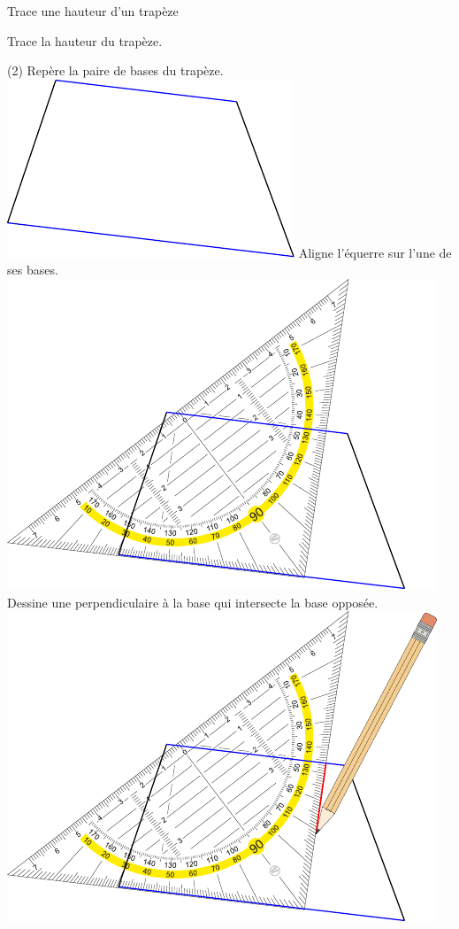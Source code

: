 \documentclass[a4paper,11pt]{report}
\let\oldcenter\center
\let\oldendcenter\endcenter
\renewenvironment{center}{\setlength\topsep{-10pt}\oldcenter}{\oldendcenter}
\begin{document}
\begin{resolu}{Trace une hauteur d'un trapèze}{Trace la hauteur du trapèze.
\begin{tasks}[column-sep=10pt](2)
    \task Repère la paire de bases du trapèze.
    \begin{center} \includegraphics[scale=0.9]{media/gm-01/trapeze1} \end{center}
    \task Aligne l'équerre sur l'une de ses bases.
    \begin{center} \includegraphics[scale=0.9]{media/gm-01/trapeze2bis} \end{center}
    \task Dessine une perpendiculaire à la base qui intersecte la base opposée.
    \begin{center} \includegraphics[scale=0.9]{media/gm-01/trapeze3bis} \end{center}

\end{tasks}}
\end{resolu}
\end{document}
